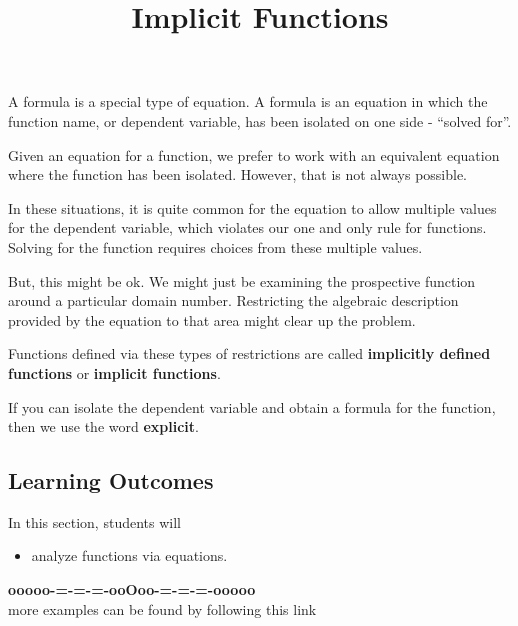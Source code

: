 \documentclass{ximera}
\title{Implicit Functions}
\begin{document}
\begin{abstract}
%
\end{abstract}
\maketitle



A formula is a special type of equation.  A formula is an equation in which the function name, or dependent variable, has been isolated on one side - ``solved for''.


Given an equation for a function, we prefer to work with an equivalent equation where the function has been isolated.  However, that is not always possible.

In these situations, it is quite common for the equation to allow multiple values for the dependent variable, which violates our one and only rule for functions.  Solving for the function requires choices from these multiple values.

But, this might be ok.  We might just be examining the prospective function around a particular domain number. Restricting the algebraic description provided by the equation to that area might clear up the problem.

Functions defined via these types of restrictions are called \textbf{implicitly defined functions} or \textbf{implicit functions}.

If you can isolate the dependent variable and obtain a formula for the function, then we use the word \textbf{explicit}.











\subsection*{Learning Outcomes}


\begin{sectionOutcomes}
In this section, students will 

\begin{itemize}
\item analyze functions via equations.
\end{itemize}
\end{sectionOutcomes}












\begin{center}
\textbf{\textcolor{green!50!black}{ooooo-=-=-=-ooOoo-=-=-=-ooooo}} \\

more examples can be found by following this link\\ 

\end{center}
\end{document}

